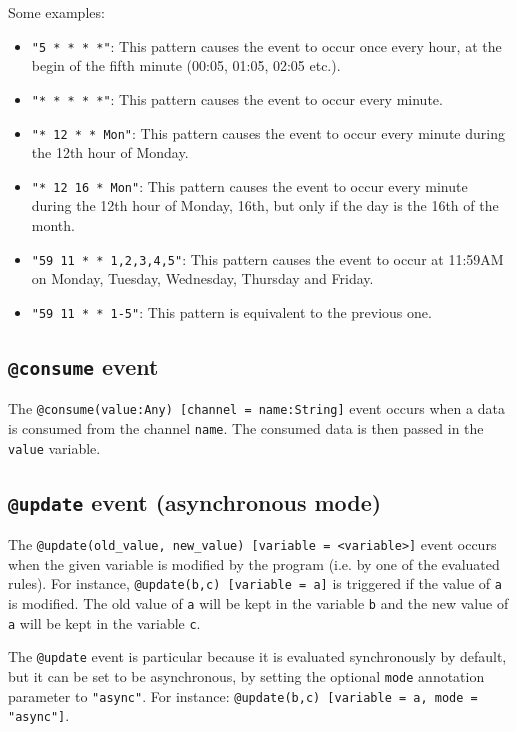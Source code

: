 \documentclass[11pt]{report}
\begin{document}
Some examples:

\begin{itemize}
\item \texttt{"5 * * * *"}: This pattern causes the event to occur once every hour, at the begin of the fifth minute (00:05, 01:05, 02:05 etc.).
\item \texttt{"* * * * *"}: This pattern causes the event to occur every minute.
\item \texttt{"* 12 * * Mon"}: This pattern causes the event to occur every minute during the 12th hour of Monday.
\item \texttt{"* 12 16 * Mon"}: This pattern causes the event to occur every minute during the 12th hour of Monday, 16th, but only if the day is the 16th of the month.
\item \texttt{"59 11 * * 1,2,3,4,5"}: This pattern causes the event to occur at 11:59AM on Monday, Tuesday, Wednesday, Thursday and Friday.
\item \texttt{"59 11 * * 1-5"}: This pattern is equivalent to the previous one.
\end{itemize}

\subsection{\texttt{@consume} event}

The \texttt{@consume(value:Any) [channel = name:String]} event occurs when a data is consumed from the channel \texttt{name}. The consumed data is then passed in the \texttt{value} variable.

\subsection{\texttt{@update} event (asynchronous mode)}

The \texttt{@update(old\_value, new\_value) [variable = <variable>]} event occurs when the given variable is modified by the program (i.e. by one of the evaluated rules). For instance, \texttt{@update(b,c) [variable = a]} is triggered if the value of \texttt{a} is modified. The old value of \texttt{a} will be kept in the variable \texttt{b} and the new value of \texttt{a} will be kept in the variable \texttt{c}.

The \texttt{@update} event is particular because it is evaluated synchronously by default, but it can be set to be asynchronous, by setting the optional \texttt{mode} annotation parameter to \texttt{"async"}. For instance: \texttt{@update(b,c) [variable = a, mode = "async"]}.
\end{document}
